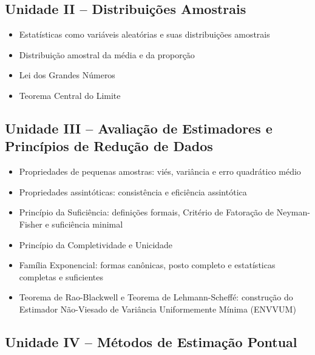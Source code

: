 \documentclass[
  letterpaper,
  DIV=11,
  numbers=noendperiod]{scrreprt}
\begin{document}
\subsection*{Unidade II -- Distribuições
Amostrais}\label{unidade-ii-distribuiuxe7uxf5es-amostrais}

\begin{itemize}
\item
  Estatísticas como variáveis aleatórias e suas distribuições amostrais
\item
  Distribuição amostral da média e da proporção
\item
  Lei dos Grandes Números
\item
  Teorema Central do Limite
\end{itemize}

\subsection*{Unidade III -- Avaliação de Estimadores e Princípios de
Redução de
Dados}\label{unidade-iii-avaliauxe7uxe3o-de-estimadores-e-princuxedpios-de-reduuxe7uxe3o-de-dados}

\begin{itemize}
\item
  Propriedades de pequenas amostras: viés, variância e erro quadrático
  médio
\item
  Propriedades assintóticas: consistência e eficiência assintótica
\item
  Princípio da Suficiência: definições formais, Critério de Fatoração de
  Neyman-Fisher e suficiência minimal
\item
  Princípio da Completividade e Unicidade
\item
  Família Exponencial: formas canônicas, posto completo e estatísticas
  completas e suficientes
\item
  Teorema de Rao-Blackwell e Teorema de Lehmann-Scheffé: construção do
  Estimador Não-Viesado de Variância Uniformemente Mínima (ENVVUM)
\end{itemize}

\subsection*{Unidade IV -- Métodos de Estimação
Pontual}\label{unidade-iv-muxe9todos-de-estimauxe7uxe3o-pontual}
\end{document}
